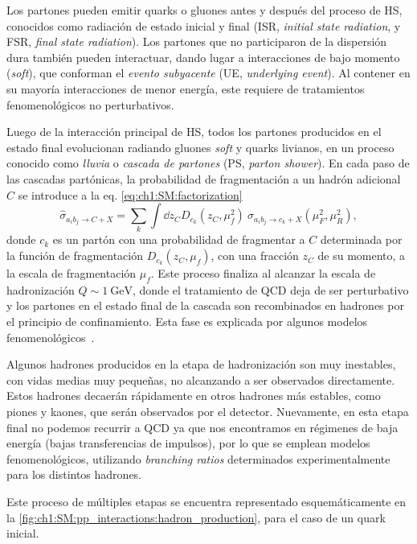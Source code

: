 Los partones pueden emitir quarks o gluones antes y después del proceso de HS, conocidos como radiación de estado inicial y final (ISR, \textit{initial state radiation}, y FSR, \textit{final state radiation}). Los partones que no participaron de la dispersión dura también pueden interactuar, dando lugar a interacciones de bajo momento (\textit{soft}), que conforman el \textit{evento subyacente} (UE, \textit{underlying event}). Al contener en su mayoría interacciones de menor energía, este requiere de tratamientos fenomenológicos no perturbativos.

Luego de la interacción principal de HS, todos los partones producidos en el estado final evolucionan radiando gluones \textit{soft} y quarks livianos, en un proceso conocido como \textit{lluvia} o \textit{cascada de partones} (PS, \textit{parton shower}). En cada paso de las cascadas partónicas, la probabilidad de fragmentación a un hadrón adicional $C$ se introduce a la eq. \eqref{eq:ch1:SM:factorization}
\[ \hat{\sigma}_{a_i b_j \to C + X} =  \sum_k \int \dd{z_C} D_{c_k}(z_C,\mu_f^2) \ \sigma_{a_i b_j \to c_k + X}(\mu_F^2, \mu_R^2), \]
donde $c_k$ es un partón con una probabilidad de fragmentar a $C$ determinada por la función de fragmentación $D_{c_k}(z_C, \mu_f)$, con una fracción $z_C$ de su momento, a la escala de fragmentación $\mu_f$. Este proceso finaliza al alcanzar la escala de hadronización $Q \sim \SI{1}{\GeV}$, donde el tratamiento de QCD deja de ser perturbativo y los partones en el estado final de la cascada son recombinados en hadrones por el principio de confinamiento. Esta fase es explicada por algunos modelos fenomenológicos~\cite{Bahr2008}. 

Algunos hadrones producidos en la etapa de hadronización son muy inestables, con vidas medias muy pequeñas, no alcanzando a ser observados directamente. Estos hadrones decaerán rápidamente en otros hadrones más estables, como piones y kaones, que serán observados por el detector. Nuevamente, en esta etapa final no podemos recurrir a QCD ya que nos encontramos en régimenes de baja energía (bajas transferencias de impulsos), por lo que se emplean modelos fenomenológicos, utilizando \textit{branching ratios} determinados experimentalmente para los distintos hadrones.

Este proceso de múltiples etapas se encuentra representado esquemáticamente en la \cref{fig:ch1:SM:pp_interactions:hadron_production}, para el caso de un quark inicial.

